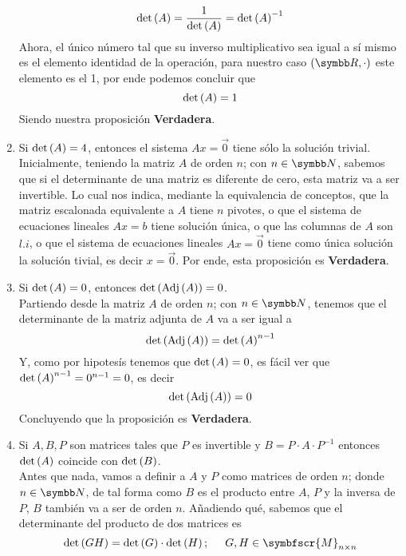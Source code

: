 \begin{enumerate}[label=\listAlph]
            \[
                \text{det} \left( A \right) = \frac{1}{\text{det} \left( A \right)} = \text{det} \left( A \right)^{-1}
            \]
            Ahora, el único número tal que su inverso multiplicativo sea igual a sí mismo es el elemento identidad de la operación, 
            para nuestro caso \(\left(\realR, \cdot\right)\) este elemento es el 1, por ende podemos concluir que
            \[
                \text{det} \left( A \right) = 1
            \]
            Siendo nuestra proposición \textbf{Verdadera}.
        \item Si \(\text{det} \left( A \right) = 4\), entonces el sistema \(Ax = \vec{0}\) tiene sólo la solución trivial. \\
            Inicialmente, teniendo la matriz \(A\) de orden \(n\); con \(n \in \realN\),
            sabemos que si el determinante de una matriz es diferente de cero, esta matriz va a ser invertible. 
            Lo cual nos indica, mediante la equivalencia de conceptos, que la matriz escalonada equivalente a \(A\) tiene \(n\) pivotes,
            o que el sistema de ecuaciones lineales \(Ax = b\) tiene solución única, o que las columnas de \(A\) son \(l.i\), o que el sistema 
            de ecuaciones lineales \(Ax = \vec{0}\) tiene como única solución la solución tivial, es decir \(x = \vec{0}\).
            Por ende, esta proposición es \textbf{Verdadera}.
        \item Si \(\text{det} \left( A \right) = 0\), entonces \(\text{det} \left( \text{Adj} \left( A \right) \right) = 0\). \\
            Partiendo desde la matriz \(A\) de orden \(n\); con \(n \in \realN\), 
            tenemos que el determinante de la matriz adjunta de \(A\) va a ser igual a 
            \[
                \text{det} \left( \text{Adj} \left( A \right) \right) = \text{det} \left( A \right)^{n-1}
            \]
            Y, como por hipotesís tenemos que \(\text{det} \left( A \right) = 0\), es fácil ver que \(\text{det} \left( A \right)^{n - 1} = 0^{n - 1} = 0\),
            es decir 
            \[
                \text{det} \left( \text{Adj} \left( A \right) \right) = 0
            \]
            Concluyendo que la proposición es \textbf{Verdadera}.
        \item Si \(A, B, P\) son matrices tales que \(P\) es invertible y \(B = P \cdot A \cdot P^{-1}\) entonces \(\text{det} \left( A \right)\) coincide con \(\text{det} \left( B \right)\). \\
            Antes que nada, vamos a definir a \(A\) y \(P\) como matrices de orden \(n\); donde \(n \in \realN\), de tal forma como \(B\) es el producto entre 
            \(A\), \(P\) y la inversa de \(P\), \(B\) también va a ser de orden \(n\). Añadiendo qué, sabemos que el determinante del producto de dos matrices es 
            \[
                \pdet{GH} = \pdet{G} \cdot \pdet{H}; \hspace{0.5cm} G, H \in \symbfscr{M}_{n \times n}
\]
\end{enumerate}
